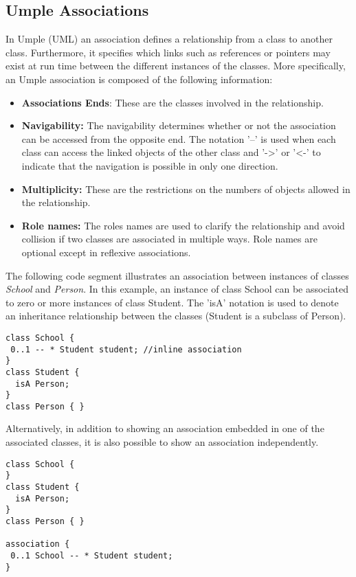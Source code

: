\subsection{Umple Associations}

In Umple (UML) an association defines a relationship from a class to another class. Furthermore, it specifies which links such as references or pointers may exist at run time between the different instances of the classes.
More specifically, an Umple association is composed of the following information:

\begin{itemize}
\item \textbf{Associations Ends}: These are the classes involved in the relationship.
\item \textbf{Navigability:} The navigability determines whether or not the association can be accessed from the opposite end. The notation '--' is used when each class can access the linked objects of the other class and '-\textgreater{}' or '\textless{}-' to indicate that the navigation is possible in only one direction.
\item \textbf{Multiplicity:} These are the restrictions on the numbers of objects allowed in the relationship.
\item \textbf{Role names:} The roles names are used to clarify the relationship and avoid collision if two classes are associated in multiple ways. Role names are optional except in reflexive associations.
\end{itemize}

The following code segment illustrates an association between instances of classes \emph{School} and \emph{Person}. In this example, an instance of class School can be associated to zero or more instances of class Student. The 'isA' notation is used to denote an inheritance relationship between the classes (Student is a subclass of Person). 
\vspace{\baselineskip}
\begin{lstlisting}[style=umplePlain]
class School {
 0..1 -- * Student student; //inline association
}
class Student {
  isA Person;
}
class Person { }
\end{lstlisting}

Alternatively, in addition to showing an association embedded in one of the associated classes, it is also possible to show an association independently. 
\vspace{\baselineskip}
\begin{lstlisting}[style=umplePlain]
class School {
}
class Student {
  isA Person;
}
class Person { }

association {
 0..1 School -- * Student student;
}
\end{lstlisting}

